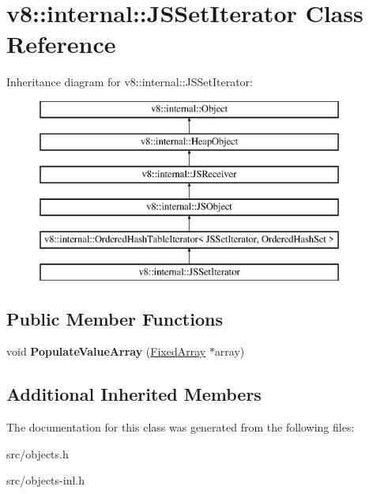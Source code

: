 \hypertarget{classv8_1_1internal_1_1_j_s_set_iterator}{}\section{v8\+:\+:internal\+:\+:J\+S\+Set\+Iterator Class Reference}
\label{classv8_1_1internal_1_1_j_s_set_iterator}
Inheritance diagram for v8\+:\+:internal\+:\+:J\+S\+Set\+Iterator\+:\begin{figure}[H]
\begin{center}
\leavevmode
\includegraphics[height=6.000000cm]{classv8_1_1internal_1_1_j_s_set_iterator}
\end{center}
\end{figure}
\subsection*{Public Member Functions}
\begin{DoxyCompactItemize}
\item 
\hypertarget{classv8_1_1internal_1_1_j_s_set_iterator_a39aa2ea726cbf6da8d5c1f61d6b288b5}{}void {\bfseries Populate\+Value\+Array} (\hyperlink{classv8_1_1internal_1_1_fixed_array}{Fixed\+Array} $\ast$array)\label{classv8_1_1internal_1_1_j_s_set_iterator_a39aa2ea726cbf6da8d5c1f61d6b288b5}

\end{DoxyCompactItemize}
\subsection*{Additional Inherited Members}


The documentation for this class was generated from the following files\+:\begin{DoxyCompactItemize}
\item 
src/objects.\+h\item 
src/objects-\/inl.\+h\end{DoxyCompactItemize}
